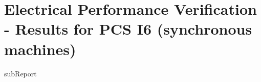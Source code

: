 \renewcommand{\DTRPcs}{I6SM} %
\renewcommand{\DTRPcsLong}{I6 (synchronous machines)}


    \section{Electrical Performance Verification - Results for PCS \DTRPcsLong}

    {{subReport}}
    \newpage

